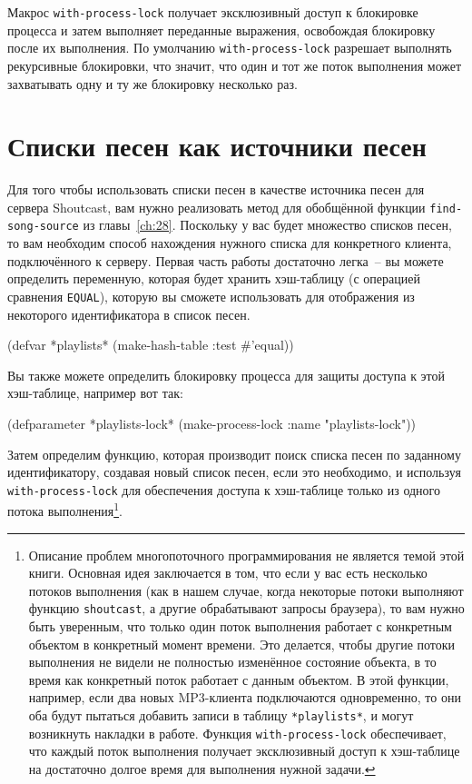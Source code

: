 Макрос \lstinline{with-process-lock} получает эксклюзивный доступ к блокировке процесса и
затем выполняет переданные выражения, освобождая блокировку после их выполнения.  По
умолчанию \lstinline{with-process-lock} разрешает выполнять рекурсивные блокировки, что
значит, что один и тот же поток выполнения может захватывать одну и ту же блокировку
несколько раз.

\section{Списки песен как источники песен}

Для того чтобы использовать списки песен в качестве источника песен для сервера
Shoutcast, вам нужно реализовать метод для обобщённой функции \lstinline{find-song-source} из
главы~\ref{ch:28}.  Поскольку у вас будет множество списков песен, то вам необходим способ
нахождения нужного списка для конкретного клиента, подключённого к серверу.  Первая часть
работы достаточно легка~-- вы можете определить переменную, которая будет хранить
хэш-таблицу (с операцией сравнения \lstinline{EQUAL}), которую вы сможете использовать для
отображения из некоторого идентификатора в список песен.

\begin{myverb}
(defvar *playlists* (make-hash-table :test #'equal))
\end{myverb}

Вы также можете определить блокировку процесса для защиты доступа к этой хэш-таблице,
например вот так:

\begin{myverb}
(defparameter *playlists-lock* (make-process-lock :name "playlists-lock"))
\end{myverb}

Затем определим функцию, которая производит поиск списка песен по заданному
идентификатору, создавая новый список песен, если это необходимо, и используя
\lstinline{with-process-lock} для обеспечения доступа к хэш-таблице только из одного потока
выполнения\footnote{Описание проблем многопоточного программирования не является темой
  этой книги. Основная идея заключается в том, что если у вас есть несколько потоков
  выполнения (как в нашем случае, когда некоторые потоки выполняют функцию
  \lstinline{shoutcast}, а другие обрабатывают запросы браузера), то вам нужно быть уверенным,
  что только один поток выполнения работает с конкретным объектом в конкретный момент
  времени.  Это делается, чтобы другие потоки выполнения не видели не полностью изменённое
  состояние объекта, в то время как конкретный поток работает с данным объектом.  В этой
  функции, например, если два новых MP3-клиента подключаются одновременно, то они оба
  будут пытаться добавить записи в таблицу \lstinline{*playlists*}, и могут возникнуть накладки
  в работе.  Функция \lstinline{with-process-lock} обеспечивает, что каждый поток выполнения
  получает эксклюзивный доступ к хэш-таблице на достаточно долгое время для выполнения
  нужной задачи.}.

